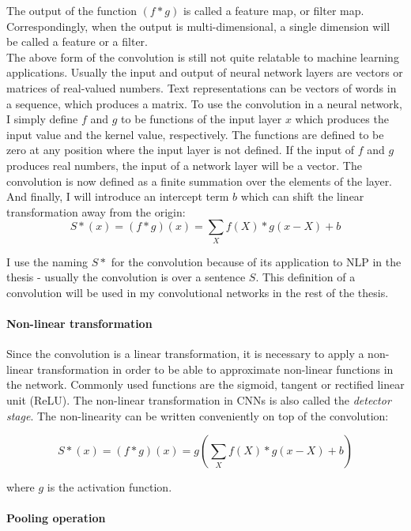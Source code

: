 The output of the function $(f * g)$ is called a feature map, or filter map. Correspondingly, when the output is multi-dimensional, a single dimension will be called a feature or a filter.\\

The above form of the convolution is still not quite relatable to machine learning applications. Usually the input and output of neural network layers are vectors or matrices of real-valued numbers. Text representations can be vectors of words in a sequence, which produces a matrix. To use the convolution in a neural network, I simply define $f$ and $g$ to be functions of the input layer $x$ which produces the input value and the kernel value, respectively. The functions are defined to be zero at any position where the input layer is not defined. 
If the input of $f$ and $g$ produces real numbers, the input of a network layer will be a vector. The convolution is now defined as a finite summation over the elements of the layer. And finally, I will introduce an intercept term $b$ which can shift the linear transformation away from the origin: 
$$
S*(x) = (f*g)(x) = \sum_X f(X) * g(x-X) + b
$$

I use the naming $S*$ for the convolution because of its application to NLP in the thesis - usually the convolution is over a sentence $S$.
This definition of a convolution will be used in my convolutional networks in the rest of the thesis.

\paragraph{Non-linear transformation}

Since the convolution is a linear transformation, it is necessary to apply a non-linear transformation in order to be able to approximate non-linear functions in the network\citep{any_function}. Commonly used functions are the sigmoid, tangent or rectified linear unit (ReLU). The non-linear transformation in CNNs is also called the \emph{detector stage}. The non-linearity can be written conveniently on top of the convolution:

$$
S*(x) = (f*g)(x) = g(\sum_X f(X) * g(x-X) + b)
$$

where $g$ is the activation function. 


\paragraph{Pooling operation}

